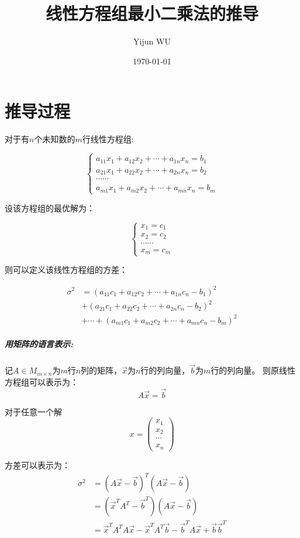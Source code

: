 \documentclass[UTF8]{ctexart}
\title{线性方程组最小二乘法的推导}
\author{Yijun WU}
\date{\today}
\begin{document}
\maketitle
\newpage
{}
\section*{推导过程}

对于有$n$个未知数的$m$行线性方程组:

$$
\left\{
    \begin{array}{cc}
        a_{11} x_1 + a_{12} x_2 + \cdots + a_{1n} x_n = b_1 \\
        a_{21} x_1 + a_{22} x_2 + \cdots + a_{2n} x_n = b_2 \\
        \cdots \cdots \\
        a_{m1} x_1 + a_{m2} x_2 + \cdots + a_{mn} x_n = b_m 
    \end{array}
\right.
$$

设该方程组的最优解为：

$$
\left\{
    \begin{array}{cc}
        x_1 = c_1 \\
        x_2 = c_2 \\
        \cdots \cdots\\
        x_m = c_m 
    \end{array}
\right.
$$

则可以定义该线性方程组的方差：

\begin{align*}
    \sigma^2 &= (a_{11} c_1 + a_{12} c_2 + \cdots + a_{1n} c_n - b_1)^2 \\
    & +(a_{21} c_1 + a_{22} c_2 + \cdots + a_{2n} c_n - b_2)^2 \\
    & + \cdots +(a_{m1} c_1 + a_{m2} c_2 + \cdots + a_{mn} c_n - b_m)^2
\end{align*}

\subparagraph*{用矩阵的语言表示:}
记$A\in M_{m\times n}$为$m$行$n$列的矩阵，$\vec{x}$为$n$行的列向量，$\vec{b}$为$m$行的列向量。
则原线性方程组可以表示为：
$$ A\vec{x}=\vec{b} $$

对于任意一个解
$$ x=\left(
    \begin{matrix}
        x_1\\
        x_2\\
        \cdots\\
        x_n
    \end{matrix}
\right) $$

方差可以表示为：
\begin{align*}
    \sigma^2 &= (A\vec{x}-\vec{b})^T (A\vec{x}-\vec{b})\\
    &= (\vec{x}^T A^T-\vec{b}^T) (A\vec{x}-\vec{b})\\
    &= \vec{x}^T A^T A \vec{x} - \vec{x}^T A^T \vec{b} - \vec{b}^T A \vec{x} + \vec{b} \vec{b}^T 
\end{align*}
\end{document}
